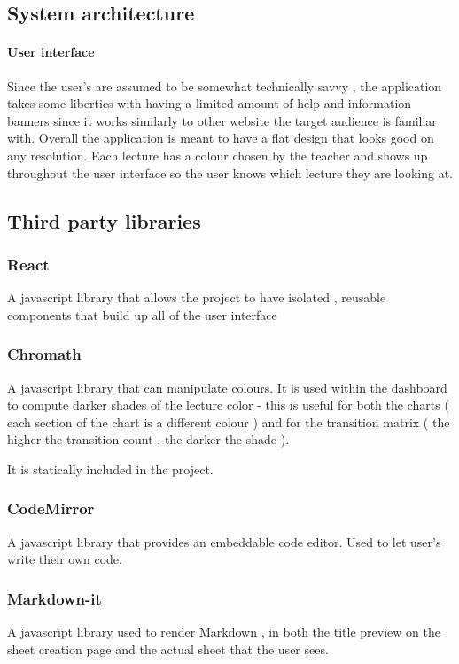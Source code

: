 \subsection{System architecture}
\paragraph{User interface}
Since the user's are assumed to be somewhat technically savvy , the application takes some liberties with having a limited amount of help and information banners since it works similarly to other website the target audience is familiar with.
Overall the application is meant to have a flat design that looks good on any resolution.
Each lecture has a colour chosen by the teacher and shows up throughout the user interface so the user knows which lecture they are looking at.

\subsection{Third party libraries}

\subsubsection{React}
A javascript library that allows the project to have isolated , reusable components that build up all of the user interface

\subsubsection{Chromath} 
A javascript library that can manipulate colours. It is used within the dashboard to compute darker shades of the lecture color - this is useful for both the charts ( each section of the chart is a different colour ) and for the transition matrix ( the higher the transition count , the darker the shade ).

	It is statically included in the project.
	
\subsubsection{CodeMirror}
A javascript library that provides an embeddable code editor. Used to let user's write their own code.

\subsubsection{Markdown-it}
A javascript library used to render Markdown , in both the title preview on the sheet creation page and the actual sheet that the user sees.

